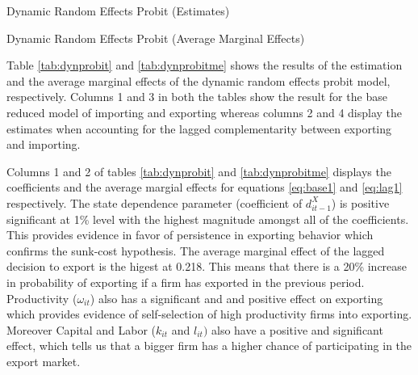 \documentclass[12pt]{article}
\begin{document}
\begin{center}
\begin{table}[H]
\caption{Dynamic Random Effects Probit (Estimates)}
\label{tab:dynprobit}

\end{table}
\end{center}
\restoregeometry
\begin{center}
\begin{table}[H]
\caption{Dynamic Random Effects Probit (Average Marginal Effects)}
\label{tab:dynprobitme}

\end{table}
\end{center}

Table \ref{tab:dynprobit} and \ref{tab:dynprobitme} shows the results of the 
estimation and the average marginal effects of the dynamic random
effects probit model, respectively. Columns 1 and 3 in both the tables show the result for the base
reduced model of importing and exporting  whereas columns 2 and 4
display the estimates when accounting for the lagged complementarity
between exporting and importing. 
 


  Columns 1 and 2 of tables \ref{tab:dynprobit} and
  \ref{tab:dynprobitme} displays the coefficients and the average
  margial effects for equations \ref{eq:base1} and \ref{eq:lag1}
  respectively. The state dependence parameter (coefficient of $d_{it-1}^{X}$) is positive
  significant at 1\% level with the highest magnitude amongst all of
  the coefficients. This provides evidence in favor of  persistence in
  exporting behavior which confirms the sunk-cost hypothesis. The average marginal effect of the lagged
  decision to export is the higest at 0.218. This  means that there is a 20\% increase
  in probability of exporting if a firm has exported in the previous
  period.  Productivity ($\omega_{it}$) also has a significant and
  and positive effect on exporting which provides evidence of
  self-selection of high productivity firms into exporting. Moreover
  Capital and Labor ($k_{it}$ and $l_{it})$
  also have a positive and significant effect, which tells us that a
  bigger firm has a higher chance of participating in the export
  market. 
\end{document}
